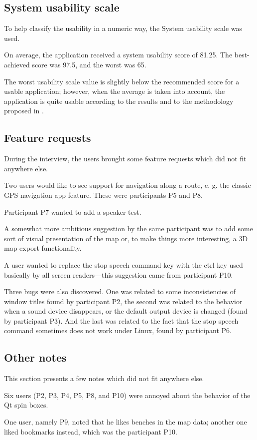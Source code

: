 \documentclass[nolof,digital]{fithesis3}
\begin{document}
\subsection{System usability scale}
To help classify the usability in a numeric way, the System usability scale was used.

On average, the application received a system usability score of 81.25. The best-achieved score was 97.5, and the worst was 65.

The worst usability scale value is slightly below the recommended score for a usable application; however, when the average is taken into account, the application is quite usable according to the results and to the methodology proposed in \parencite{SauroJeff2012Qtue}.
\subsection{Feature requests}
During the interview, the users brought some feature requests which did not fit anywhere else.

Two users would like to see support for navigation along a route, e. g. the classic GPS navigation app feature. These were participants P5 and P8.

Participant P7 wanted to add a speaker test.

A somewhat more ambitious suggestion by the same participant was to add some sort of visual presentation of the map or, to make things more interesting, a 3D map export functionality.

A user wanted to replace the stop speech command key with the ctrl key used basically by all screen readers—this suggestion came from participant P10.

Three bugs were also discovered. One was related to some inconsistencies of window titles found by participant P2, the second was related to the behavior when a sound device disappears, or the default output device is changed (found by participant P3). And the last was related to the fact that the stop speech command sometimes does not work under Linux, found by participant P6.
\subsection{Other notes}
This section presents a few notes which did not fit anywhere else.

Six users (P2, P3, P4, P5, P8, and P10) were annoyed about the behavior of the Qt spin boxes.

One user, namely P9, noted that he likes benches in the map data; another one liked bookmarks instead, which was the participant P10.
\end{document}
